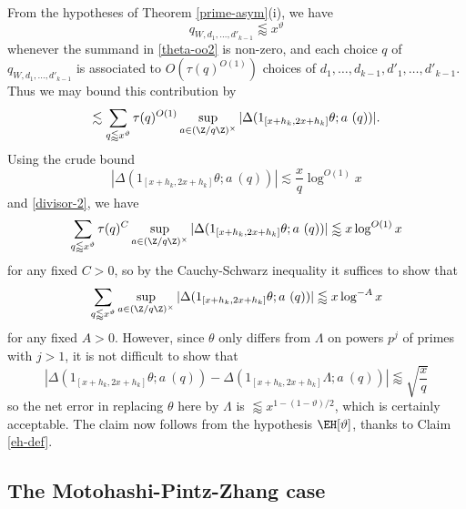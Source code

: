 From the hypotheses of Theorem \ref{prime-asym}(i), we have
$$ q_{W,d_1,\dots,d'_{k-1}} \lessapprox x^\vartheta$$
whenever the summand in \eqref{theta-oo2} is non-zero, and each choice $q$ of $q_{W,d_1,\dots,d'_{k-1}}$ is associated to $O( \tau(q)^{O(1)} )$ choices of $d_1,\dots,d_{k-1},d'_1,\dots,d'_{k-1}$.  Thus we may bound this contribution by
$$
\lesssim \sum_{q \lessapprox x^\vartheta} \tau(q)^{O(1)} \sup_{a \in (\Z/q\Z)^\times} |\Delta( 1_{[x+h_k,2x+h_k]} \theta; a\ (q) )|.$$
Using the crude bound
$$ |\Delta( 1_{[x+h_k,2x+h_k]} \theta; a\ (q) )| \lesssim \frac{x}{q} \log^{O(1)} x$$
and \eqref{divisor-2}, we have
$$ \sum_{q \lessapprox x^\vartheta} \tau(q)^C \sup_{a \in (\Z/q\Z)^\times} |\Delta( 1_{[x+h_k,2x+h_k]} \theta; a\ (q) )| \lessapprox x \log^{O(1)} x$$
for any fixed $C>0$, so by the Cauchy-Schwarz inequality it suffices to show that
$$ \sum_{q \lessapprox x^\vartheta} \sup_{a \in (\Z/q\Z)^\times} |\Delta( 1_{[x+h_k,2x+h_k]} \theta; a\ (q) )| \lessapprox x \log^{-A} x$$
for any fixed $A>0$.  However, since $\theta$ only differs from $\Lambda$ on powers $p^j$ of primes with $j>1$, it is not difficult to show that
$$  |\Delta( 1_{[x+h_k,2x+h_k]} \theta; a\ (q) ) -  \Delta( 1_{[x+h_k,2x+h_k]} \Lambda; a\ (q) )| \lessapprox \sqrt{\frac{x}{q}}$$
so the net error in replacing $\theta$ here by $\Lambda$ is $\lessapprox x^{1 - (1-\vartheta)/2}$, which is certainly acceptable.  The claim now follows from the hypothesis $\EH[\vartheta]$, thanks to Claim \ref{eh-def}.


\subsection{The Motohashi-Pintz-Zhang case}

